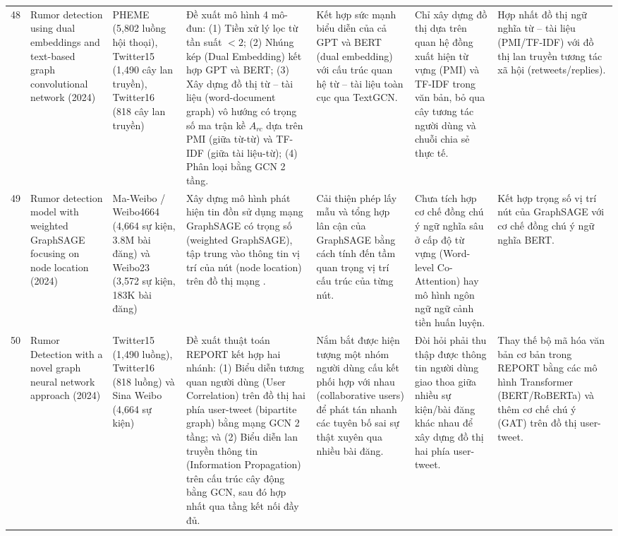 \documentclass[11pt,a4paper]{extreport}
\begin{document}
\begin{landscape}
\begin{longtable}{@{}C{0.6cm}p{3.6cm}p{2.7cm}p{4.8cm}p{3.6cm}p{3.6cm}p{3.6cm}@{}}
48 & Rumor detection using dual embeddings and text-based graph convolutional network (2024) \cite{noauthor_rumor_2024} & PHEME (5,802 luồng hội thoại), Twitter15 (1,490 cây lan truyền), Twitter16 (818 cây lan truyền) & Đề xuất mô hình 4 mô-đun: (1) Tiền xử lý lọc từ tần suất $<2$; (2) Nhúng kép (Dual Embedding) kết hợp GPT và BERT; (3) Xây dựng đồ thị từ -- tài liệu (word-document graph) vô hướng có trọng số ma trận kề $A_{rc}$ dựa trên PMI (giữa từ-từ) và TF-IDF (giữa tài liệu-từ); (4) Phân loại bằng GCN 2 tầng. & Kết hợp sức mạnh biểu diễn của cả GPT và BERT (dual embedding) với cấu trúc quan hệ từ -- tài liệu toàn cục qua TextGCN. & Chỉ xây dựng đồ thị dựa trên quan hệ đồng xuất hiện từ vựng (PMI) và TF-IDF trong văn bản, bỏ qua cây tương tác người dùng và chuỗi chia sẻ thực tế. & Hợp nhất đồ thị ngữ nghĩa từ -- tài liệu (PMI/TF-IDF) với đồ thị lan truyền tương tác xã hội (retweets/replies). \\ 

49 & Rumor detection model with weighted GraphSAGE focusing on node location (2024) \cite{noauthor_rumor_2024-1} & Ma-Weibo / Weibo4664 (4,664 sự kiện, 3.8M bài đăng) và Weibo23 (3,572 sự kiện, 183K bài đăng) & Xây dựng mô hình phát hiện tin đồn sử dụng mạng GraphSAGE có trọng số (weighted GraphSAGE), tập trung vào thông tin vị trí của nút (node location) trên đồ thị mạng \cite{noauthor_rumor_2024-1}. & Cải thiện phép lấy mẫu và tổng hợp lân cận của GraphSAGE bằng cách tính đến tầm quan trọng vị trí cấu trúc của từng nút. & Chưa tích hợp cơ chế đồng chú ý ngữ nghĩa sâu ở cấp độ từ vựng (Word-level Co-Attention) hay mô hình ngôn ngữ ngữ cảnh tiền huấn luyện. & Kết hợp trọng số vị trí nút của GraphSAGE với cơ chế đồng chú ý ngữ nghĩa BERT. \\ 

50 & Rumor Detection with a novel graph neural network approach (2024) \cite{noauthor_rumor_2024-2} & Twitter15 (1,490 luồng), Twitter16 (818 luồng) và Sina Weibo (4,664 sự kiện) & Đề xuất thuật toán REPORT kết hợp hai nhánh: (1) Biểu diễn tương quan người dùng (User Correlation) trên đồ thị hai phía user-tweet (bipartite graph) bằng mạng GCN 2 tầng; và (2) Biểu diễn lan truyền thông tin (Information Propagation) trên cấu trúc cây động bằng GCN, sau đó hợp nhất qua tầng kết nối đầy đủ. & Nắm bắt được hiện tượng một nhóm người dùng cấu kết phối hợp với nhau (collaborative users) để phát tán nhanh các tuyên bố sai sự thật xuyên qua nhiều bài đăng. & Đòi hỏi phải thu thập được thông tin người dùng giao thoa giữa nhiều sự kiện/bài đăng khác nhau để xây dựng đồ thị hai phía user-tweet. & Thay thế bộ mã hóa văn bản cơ bản trong REPORT bằng các mô hình Transformer (BERT/RoBERTa) và thêm cơ chế chú ý (GAT) trên đồ thị user-tweet. \\ 


\end{longtable}
\end{landscape}
\end{document}
